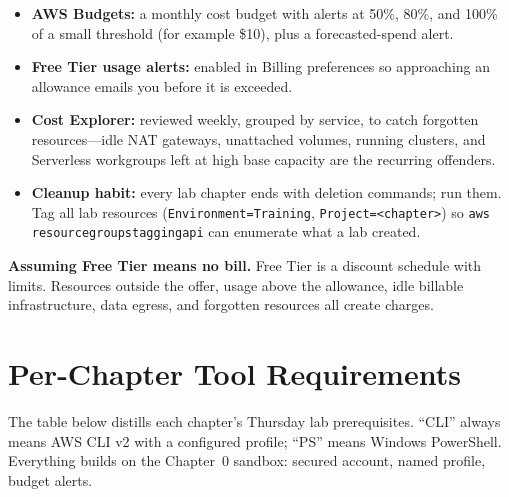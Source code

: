 \begin{itemize}
    \item \textbf{AWS Budgets:} a monthly cost budget with alerts at 50\%, 80\%, and 100\% of a
    small threshold (for example \$10), plus a forecasted-spend alert.
    \item \textbf{Free Tier usage alerts:} enabled in Billing preferences so approaching an
    allowance emails you before it is exceeded.
    \item \textbf{Cost Explorer:} reviewed weekly, grouped by service, to catch forgotten
    resources---idle NAT gateways, unattached volumes, running clusters, and Serverless workgroups
    left at high base capacity are the recurring offenders.
    \item \textbf{Cleanup habit:} every lab chapter ends with deletion commands; run them. Tag all
    lab resources (\texttt{Environment=Training}, \texttt{Project=<chapter>}) so
    \texttt{aws resourcegroupstaggingapi} can enumerate what a lab created.
\end{itemize}

\begin{pitfall}
\textbf{Assuming Free Tier means no bill.} Free Tier is a discount schedule with limits. Resources
outside the offer, usage above the allowance, idle billable infrastructure, data egress, and
forgotten resources all create charges.
\end{pitfall}

\section{Per-Chapter Tool Requirements}
%
The table below distills each chapter's Thursday lab prerequisites. ``CLI'' always means AWS CLI
v2 with a configured profile; ``PS'' means Windows PowerShell. Everything builds on the Chapter~0
sandbox: secured account, named profile, budget alerts.

